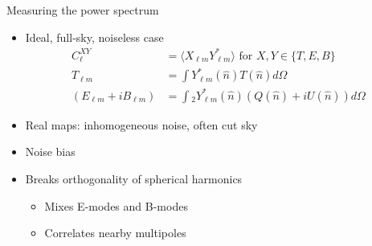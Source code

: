 \documentclass{beamer}
\begin{document}
\begin{frame}{Measuring the power spectrum}
	\begin{itemize}
		\item Ideal, full-sky, noiseless case
			\begin{align*}
				C_\ell^{XY} &= \langle X_{\ell m} Y_{\ell m}^* \rangle \textrm{  for  } X,Y \in \{T,E,B\} \\
				T_{\ell m} &= \int Y_{\ell m}^*(\hat n) T(\hat n) d\Omega \\
				(E_{\ell m} + iB_{\ell m}) &= \int {}_2Y_{\ell m}^*(\hat n)(Q(\hat n)+iU(\hat n)) d\Omega
			\end{align*}
		\item Real maps: inhomogeneous noise, often cut sky
		\item Noise bias
		\item Breaks orthogonality of spherical harmonics
			\begin{itemize}
				\item Mixes E-modes and B-modes
				\item Correlates nearby multipoles
			\end{itemize}
	\end{itemize}
\end{frame}
\end{document}
